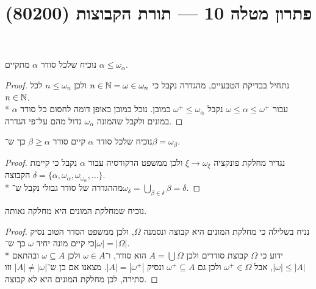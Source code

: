 
\title{פתרון מטלה 10 --- תורת הקבוצות (80200)}

\DeclareMathOperator\dom{dom}
\DeclareMathOperator\add{Add}
\DeclareMathOperator\mult{Mult}

\maketitle
\maketitleprint{}

\Question{}
נוכיח שלכל סודר $\alpha$ מתקיים $\alpha \le \omega_\alpha$.
\begin{proof}
	נתחיל בבדיקת הטבעיים, מהגדרה נקבל כי $n \in \mathbb{N} = \omega \in \omega_n$ ולכן $n \le \omega_n$ לכל $n \in \mathbb{N}$. \\*
	עבור $\omega \le \alpha \le \omega^+$ נקבל $\omega^+ \le \omega_\alpha$ כמובן.
	נוכל כמובן באופן דומה לחסום כל סודר $\alpha$ במונים ולקבל שהמונה $\omega_\alpha$ גדול מהם על־פי הגדרה.
\end{proof}

\Question{}
נוכיח שלכל סודר $\alpha$ קיים סודר $\beta \ge \alpha$ כך ש־$\beta = \omega_\beta$.
\begin{proof}
	נגדיר מחלקת פונקציה $\xi \to \omega_\xi$ ולכן ממשפט הרקורסיה עבור $\alpha$ נקבל כי קיימת הקבוצה $\delta = \{ \alpha, \omega_\alpha, \omega_{\omega_\alpha}, \dots \}$. \\*
	מההגדרה של סודר גבולי נקבל ש־$\omega_\delta = \bigcup_{\beta \in \delta} \beta = \delta$.
\end{proof}

\Question{}
נוכיח שמחלקת המונים היא מחלקה נאותה.
\begin{proof}
	נניח בשלילה כי מחלקת המונים היא קבוצה ונסמנה $\Omega$, ולכן ממשפט הסדר הטוב נסיק כי קיים מונה יחיד $\omega$ כך ש־$|\omega| = |\Omega|$. \\*
	ידוע כי $\Omega$ קבוצת סודרים ולכן $A = \bigcup \Omega$ הוא סודר, ו־$\omega \in A$ ולכן $\omega \subseteq A$ ובהתאם $|\omega| \le |A|$, אבל $\omega^+ \in \Omega$ ולכן גם $\omega^+ \subseteq A$ ונסיק $|A| = |\omega^+|$.
	מצאנו אם כן ש־$|A| \ne |\omega|$ וזו סתירה, לכן מחלקת המונים היא לא קבוצה.
\end{proof}

